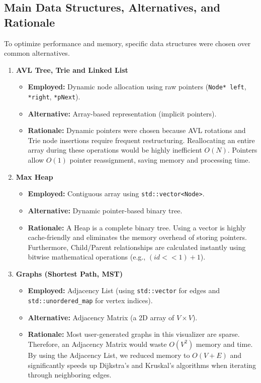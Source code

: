\subsection{Main Data Structures, Alternatives, and Rationale}
To optimize performance and memory, specific data structures were chosen over common alternatives.

\begin{enumerate}
    \item \textbf{AVL Tree, Trie and Linked List}
    \begin{itemize}
        \item \textbf{Employed:} Dynamic node allocation using raw pointers (\texttt{Node* left}, \texttt{*right}, \texttt{*pNext}).
        \item \textbf{Alternative:} Array-based representation (implicit pointers).
        \item \textbf{Rationale:} Dynamic pointers were chosen because AVL rotations and Trie node insertions require frequent restructuring. Reallocating an entire array during these operations would be highly inefficient $O(N)$. Pointers allow $O(1)$ pointer reassignment, saving memory and processing time.
    \end{itemize}

    \item \textbf{Max Heap}
    \begin{itemize}
        \item \textbf{Employed:} Contiguous array using \texttt{std::vector<Node>}.
        \item \textbf{Alternative:} Dynamic pointer-based binary tree.
        \item \textbf{Rationale:} A Heap is a complete binary tree. Using a vector is highly cache-friendly and eliminates the memory overhead of storing pointers. Furthermore, Child/Parent relationships are calculated instantly using bitwise mathematical operations (e.g., $(id << 1) + 1$).
    \end{itemize}

    \item \textbf{Graphs (Shortest Path, MST)}
    \begin{itemize}
        \item \textbf{Employed:} Adjacency List (using \texttt{std::vector} for edges and \texttt{std::unordered\_map} for vertex indices).
        \item \textbf{Alternative:} Adjacency Matrix (a 2D array of $V \times V$).
        \item \textbf{Rationale:} Most user-generated graphs in this visualizer are sparse. Therefore, an Adjacency Matrix would waste $O(V^2)$ memory and time. By using the Adjacency List, we reduced memory to $O(V + E)$ and significantly speeds up Dijkstra's and Kruskal's algorithms when iterating through neighboring edges.
    \end{itemize}
\end{enumerate}